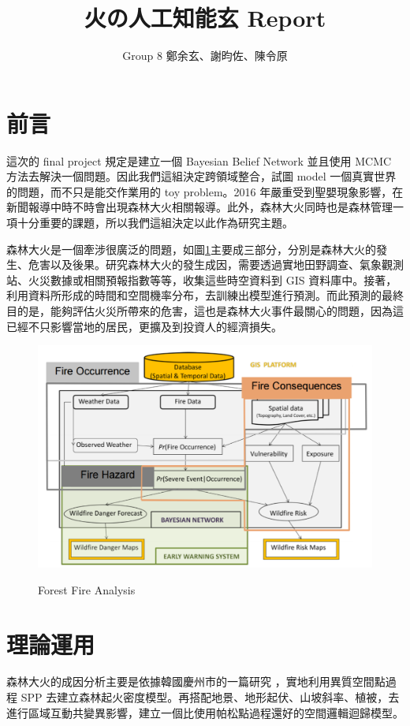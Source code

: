 \documentclass[a4paper]{article}
\title{火の人工知能玄 Report}
\author{Group 8 鄭余玄、謝昀佐、陳令原}
\date{}
\begin{document}
\maketitle
\section{前言}
這次的 final project 規定是建立一個 Bayesian Belief Network 並且使用 MCMC 方法去解決一個問題。因此我們這組決定跨領域整合，試圖 model 一個真實世界的問題，而不只是能交作業用的 toy problem。2016 年嚴重受到聖嬰現象影響，在新聞報導中時不時會出現森林大火相關報導。此外，森林大火同時也是森林管理一項十分重要的課題，所以我們這組決定以此作為研究主題。

森林大火是一個牽涉很廣泛的問題，如圖\ref{ffp}主要成三部分，分別是森林大火的發生、危害以及後果。研究森林大火的發生成因，需要透過實地田野調查、氣象觀測站、火災數據或相關預報指數等等，收集這些時空資料到 GIS 資料庫中。接著，利用資料所形成的時間和空間機率分布，去訓練出模型進行預測。而此預測的最終目的是，能夠評估火災所帶來的危害，這也是森林大火事件最關心的問題，因為這已經不只影響當地的居民，更擴及到投資人的經濟損失。

\begin{figure}[h]
  \caption{Forest Fire Analysis}
  \centering
  \includegraphics[width=1\textwidth]{problem}
  \label{ffp}
\end{figure}

\section{理論運用}
森林大火的成因分析主要是依據韓國慶州市的一篇研究 \cite{MCFFSK}，實地利用異質空間點過程 SPP 去建立森林起火密度模型。再搭配地景、地形起伏、山坡斜率、植被，去進行區域互動共變異影響，建立一個比使用帕松點過程還好的空間邏輯迴歸模型。
\end{document}

